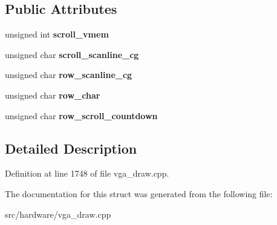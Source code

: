 \subsection*{Public Attributes}
\begin{DoxyCompactItemize}
\item 
\hypertarget{structText__Draw__State_a72dcde92c1d0b0338acc888a51f30914}{unsigned int {\bfseries scroll\-\_\-vmem}}\label{structText__Draw__State_a72dcde92c1d0b0338acc888a51f30914}

\item 
\hypertarget{structText__Draw__State_ad34090de4ca22fb0777f5eb7056cf5e9}{unsigned char {\bfseries scroll\-\_\-scanline\-\_\-cg}}\label{structText__Draw__State_ad34090de4ca22fb0777f5eb7056cf5e9}

\item 
\hypertarget{structText__Draw__State_a699f693c31130b23e9ba2380e8c80f20}{unsigned char {\bfseries row\-\_\-scanline\-\_\-cg}}\label{structText__Draw__State_a699f693c31130b23e9ba2380e8c80f20}

\item 
\hypertarget{structText__Draw__State_a806bd82f87fd54eb3186dabad62f5771}{unsigned char {\bfseries row\-\_\-char}}\label{structText__Draw__State_a806bd82f87fd54eb3186dabad62f5771}

\item 
\hypertarget{structText__Draw__State_a013c45ffb9b60f0dc579952522746518}{unsigned char {\bfseries row\-\_\-scroll\-\_\-countdown}}\label{structText__Draw__State_a013c45ffb9b60f0dc579952522746518}

\end{DoxyCompactItemize}


\subsection{Detailed Description}


Definition at line 1748 of file vga\-\_\-draw.\-cpp.



The documentation for this struct was generated from the following file\-:\begin{DoxyCompactItemize}
\item 
src/hardware/vga\-\_\-draw.\-cpp\end{DoxyCompactItemize}
